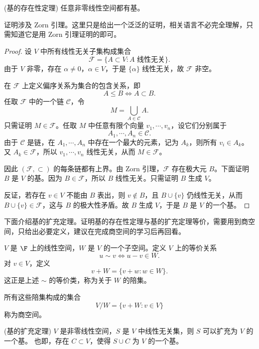 \begin{proposition}(基的存在性定理)
	任意非零线性空间都有基。
\end{proposition}
证明涉及 Zorn 引理。这里只是给出一个泛泛的证明，相关语言不必完全理解，只需知道它是用 Zorn 引理证明的即可。
\begin{proof}
	设 $V$ 中所有线性无关子集构成集合
	\[
	\mathcal{F}=\{A\subset V: A\text{ 线性无关}\}.
	\]
	由于 $V$ 非零，存在 $\alpha\neq 0$，$\alpha\in V$，于是 $\{\alpha\}$ 线性无关，故 $\mathcal{F}$ 非空。
	
	在 $\mathcal{F}$ 上定义偏序关系为集合的包含关系，即
	\[
	A\leq B\Longleftrightarrow A\subset B.
	\]
	任取 $\mathcal{F}$ 中的一个链 $\mathcal{C}$，令
	\[
	M=\bigcup_{A\in\mathcal{C}}A.
	\]
	只需证明 $M\in\mathcal{F}$。任取 $M$ 中任意有限个向量 $v_1,\cdots,v_n$，设它们分别属于
	\[
	A_1,\cdots,A_n\in\mathcal{C}.
	\]
	由于 $\mathcal{C}$ 是链，在 $A_1,\cdots,A_n$ 中存在一个最大的元素，记为 $A_k$，则所有 $v_i\in A_k$。又 $A_k\in\mathcal{F}$，所以 $v_1,\cdots,v_n$ 线性无关，从而 $M\in\mathcal{F}$。
	
	因此 $(\mathcal{F},\subset)$ 的每条链都有上界。由 Zorn 引理，$\mathcal{F}$ 存在极大元 $B$。下面证明 $B$ 是 $V$ 的基。因为 $B\in\mathcal{F}$，所以 $B$ 线性无关。只需证明 $B$ 生成 $V$。
	
	反证，若存在 $v\in V$ 不能由 $B$ 表出，则 $v\notin B$，且 $B\cup\{v\}$ 仍线性无关，从而 $B\cup\{v\}\in\mathcal{F}$，这与 $B$ 的极大性矛盾。故 $B$ 生成 $V$，于是 $B$ 是 $V$ 的一个基。
\end{proof}

下面介绍基的扩充定理。证明基的存在性定理与基的扩充定理等价，需要用到商空间，只给出必要定义，建议在完成商空间的学习后再回看。

\begin{definition}
	$V$ 是 $\F$ 上的线性空间，$W$ 是 $V$ 的一个子空间。定义 $V$ 上的等价关系
	\[
	u\sim v\Longleftrightarrow u-v\in W.
	\]
	对 $v\in V$，定义
	\[
	v+W=\{v+w:w\in W\}.
	\]
	这正是上述 $\sim$ 的等价类，称为关于 $W$ 的陪集。
	
	所有这些陪集构成的集合
	\[
	V/W=\{v+W:v\in V\}
	\]
	称为商空间。
\end{definition}

\begin{proposition}(基的扩充定理)
	$V$ 是非零线性空间，$S$ 是 $V$ 中线性无关集，则 $S$ 可以扩充为 $V$ 的一个基。
	也即，存在 $C\subset V$，使得 $S\cup C$ 为 $V$ 的一个基。
\end{proposition}

